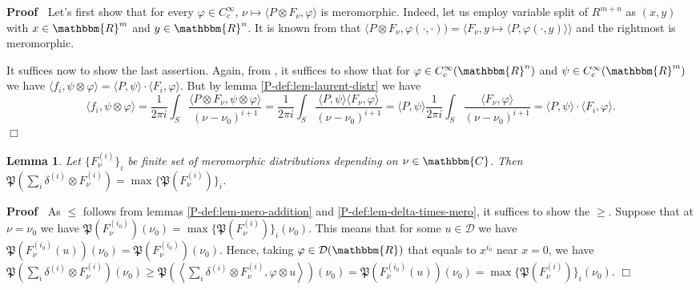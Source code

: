 \documentclass{article}
\newenvironment{proof}{\noindent\textbf{Proof\ }}{\hspace*{\fill}$\Box$\medskip}
\numberwithin{definition}{section}
\newtheorem{lemma}{Lemma}
\numberwithin{lemma}{section}
\numberwithin{proposition}{section}
{\theorembodyfont{\rmfamily}\newtheorem{remark}{Remark}
\numberwithin{remark}{section}
}
\begin{document}
\begin{proof}
  Let's first show that for every $\varphi \in C_c^{\infty}$, $\nu \mapsto
  \langle P \otimes F_{\nu}, \varphi \rangle$ is meromorphic. Indeed, let us
  employ variable split of $R^{m + n}$ as $( x, y)$ with $x \in \mathbbm{R}^m$
  and $y \in \mathbbm{R}^n$. It is known from {\cite[thm.
  5.1.1]{hormander1983analysis}} that $\langle P \otimes F_{\nu}, \varphi (
  \cdot, \cdot)) = \langle F_{\nu}, y \mapsto \langle P, \varphi ( \cdot, y)
  \rangle \rangle$ and the rightmost is meromorphic.
  
  It suffices now to show the last assertion. Again, from {\cite[thm.
  5.1.1]{hormander1983analysis}}, it suffices to show that for $\varphi \in
  C^{\infty}_c ( \mathbbm{R}^n)$ and $\psi \in C_c^{\infty} ( \mathbbm{R}^m)$
  we have $\langle f_i, \psi \otimes \varphi \rangle = \langle P, \psi \rangle
  \cdot \langle F_i, \varphi \rangle$. But by lemma
  \ref{P-def:lem-laurent-distr} we have
  \[ \langle f_i, \psi \otimes \varphi \rangle = \frac{1}{2 \pi i} \int_S
     \frac{\langle P \otimes F_{\nu}, \psi \otimes \varphi \rangle}{( \nu -
     \nu_0)^{i + 1}} = \frac{1}{2 \pi i} \int_S \frac{\langle P, \psi \rangle
     \langle F_{\nu}, \varphi \rangle}{( \nu - \nu_0)^{i + 1}} = \langle P,
     \psi \rangle \frac{1}{2 \pi i} \int_S \frac{\langle F_{\nu}, \varphi
     \rangle}{( \nu - \nu_0)^{i + 1}} = \langle P, \psi \rangle \cdot \langle
     F_i, \varphi \rangle . \]
\end{proof}

\begin{lemma}
  \label{P-def:lem-delta-max}Let $\{ F_{\nu}^{( i)} \}_i$ be finite set of
  meromorphic distributions depending on $\nu \in \mathbbm{C}$. Then
  $\mathfrak{P} \left( \sum_i \delta^{( i)} \otimes F^{( i)}_{\nu} \right) =
  \max \{ \mathfrak{P} ( F_{\nu}^{( i)}) \}_i$.
\end{lemma}

\begin{proof}
  As $\leqslant$ follows from lemmas \ref{P-def:lem-mero-addition} and
  \ref{P-def:lem-delta-times-mero}, it suffices to show the $\geqslant$.
  Suppose that at $\nu = \nu_0$ we have $\mathfrak{P} ( F_{\nu}^{( i_0)}) (
  \nu_0) = \max \{ \mathfrak{P} ( F_{\nu}^{( i)}) \}_i ( \nu_0)$. This means
  that for some $u \in \mathcal{D}$ we have $\mathfrak{P} ( F_{\nu}^{( i_0)} (
  u)) ( \nu_0) =\mathfrak{P} ( F_{\nu}^{( i_0)}) ( \nu_0)$. Hence, taking
  $\varphi \in \mathcal{D} ( \mathbbm{R})$ that equals to $x^{i_0}$ near $x =
  0$, we have $\mathfrak{P} \left( \sum_i \delta^{( i)} \otimes F^{( i)}_{\nu}
  \right) ( \nu_0) \geqslant \mathfrak{P} \left( \left\langle \sum_i \delta^{(
  i)} \otimes F^{( i)}_{\nu}, \varphi \otimes u \right\rangle \right) ( \nu_0)
  =\mathfrak{P} ( F_{\nu}^{( i_0)} ( u)) ( \nu_0) = \max \{ \mathfrak{P} (
  F_{\nu}^{( i)}) \}_i ( \nu_0)$.
\end{proof}
\end{document}
